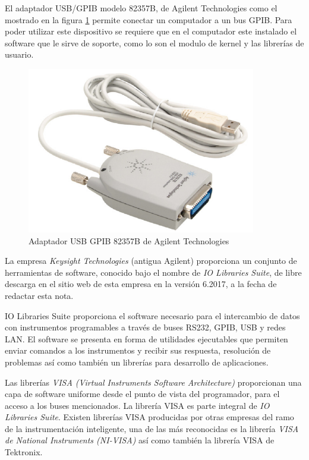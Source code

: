 \documentclass[paper=letter,oneside,fontsize=11pt, parskip=full]{scrartcl}
\begin{document}
		El adaptador USB/GPIB modelo 82357B, de Agilent Technologies como el mostrado en la figura \ref{Fig:AdaptadorGpibUsb} permite conectar un computador a un bus GPIB. Para poder utilizar este dispositivo se requiere que en el computador este instalado el software que le sirve de soporte, como lo son el modulo de kernel y las librerías de usuario.	
		
		\begin{figure}[!h]
			\begin{center}
				\includegraphics[width=10cm]{Imagenes/AdaptadorGpibUsb.pdf}
				\caption{Adaptador USB GPIB 82357B de Agilent Technologies}
				\label{Fig:AdaptadorGpibUsb}
			\end{center}
		\end{figure}	
		
		La empresa \emph{Keysight Technologies} (antigua Agilent) proporciona un conjunto de herramientas de software, conocido bajo el nombre de \emph{IO Libraries Suite}, de libre descarga en el sitio web de esta empresa en la versión 6.2017, a la fecha de redactar esta nota.
		
		IO Libraries Suite proporciona el software necesario para el intercambio de datos con instrumentos programables a través de buses RS232, GPIB, USB y redes LAN. El software se presenta en forma de utilidades ejecutables que permiten enviar comandos a los instrumentos y recibir sus respuesta, resolución de problemas así como también un librerías para desarrollo de aplicaciones.
		
		Las librerías \emph{VISA (Virtual Instruments Software Architecture) } proporcionan una capa de software uniforme desde el punto de vista del programador, para el acceso a los buses mencionados. La librería VISA es parte integral de \emph{IO Libraries Suite}. Existen librerías VISA producidas por otras empresas del ramo de la instrumentación inteligente, una de las más reconocidas es la librería \emph{VISA de National Instruments (NI-VISA)} así como también la librería VISA de Tektronix.
		
\end{document}
